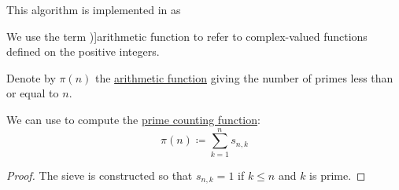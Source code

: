 \begin{comments}
  \item This algorithm is implemented in \cite{notebook:code} as
  \begin{CodeRefDisplay}
  \end{CodeRefDisplay}
\end{comments}

\begin{definition}\label{def:arithmetic_function}
  We use the term \term[en=arithmetical function (\cite[24]{Apostol1976AnalyticNumberTheory})]{arithmetic function} to refer to complex-valued functions defined on the positive integers.
\end{definition}

\begin{definition}\label{def:prime_counting_function}
  Denote by \( \pi(n) \) the \hyperref[def:arithmetic_function]{arithmetic function} giving the number of primes less than or equal to \( n \).
\end{definition}

\begin{proposition}\label{thm:prime_counting_sieve}
  We can use  to compute the \hyperref[def:prime_counting_function]{prime counting function}:
  \begin{equation*}
    \pi(n) \coloneqq \sum_{k=1}^n s_{n,k}
  \end{equation*}
\end{proposition}
\begin{proof}
  The sieve is constructed so that \( s_{n,k} = 1 \) if \( k \leq n \) and \( k \) is prime.
\end{proof}

